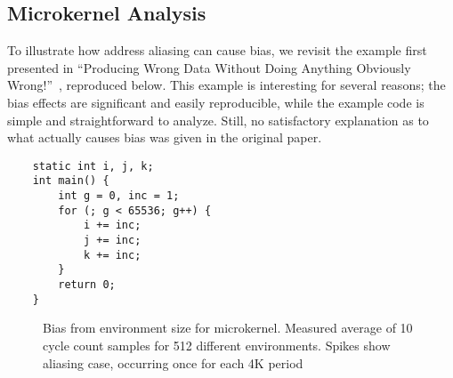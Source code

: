 \documentclass[prodmode,acmtaco]{acmsmall}
\begin{document}
\subsection{Microkernel Analysis}
To illustrate how address aliasing can cause bias, we revisit the example first presented in ``Producing Wrong Data Without Doing Anything Obviously Wrong!''~\cite{Mytkowicz:2009:WrongData}, reproduced below. 
This example is interesting for several reasons; the bias effects are significant and easily reproducible, while the example code is simple and straightforward to analyze.
Still, no satisfactory explanation as to what actually causes bias was given in the original paper.

  \begin{lstlisting}
    static int i, j, k;
    int main() {
        int g = 0, inc = 1;
        for (; g < 65536; g++) {
            i += inc;
            j += inc;
            k += inc; 
        }
        return 0;
    }
  \end{lstlisting}


\begin{figure*}[t]
  \caption{Bias from environment size for microkernel. Measured average of 10 cycle count samples for 512 different environments. Spikes show aliasing case, occurring once for each 4K period}
  \label{fig:envbias}
\end{figure*}
\end{document}
